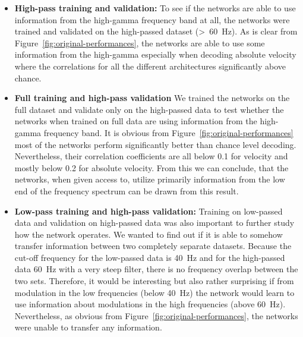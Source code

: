\begin{itemize}
    \item \textbf{High-pass training and validation:} To see if the networks are able to use information from the high-gamma frequency band at all, the networks were trained and validated on the high-passed dataset (>~60~Hz).
    As is clear from Figure~\ref{fig:original-performances}, the networks are able to use some information from the high-gamma especially when decoding absolute velocity where the correlations for all the different architectures significantly above chance.
    \item \textbf{Full training and high-pass validation} We trained the networks on the full dataset and validate only on the high-passed data to test whether the networks when trained on full data are using information from the high-gamma frequency band.
    It is obvious from Figure~\ref{fig:original-performances} most of the networks perform significantly better than chance level decoding.
    Nevertheless, their correlation coefficients are all below 0.1 for velocity and mostly below 0.2 for absolute velocity.
    From this we can conclude, that the networks, when given access to, utilize primarily information from the low end of the frequency spectrum can be drawn from this result.
    \item \textbf{Low-pass training and high-pass validation:}
    Training on low-passed data and validation on high-passed data was also important to further study how the network operates.
    We wanted to find out if it is able to somehow transfer information between two completely separate datasets.
    Because the cut-off frequency for the low-passed data is 40~Hz and for the high-passed data 60~Hz with a very steep filter, there is no frequency overlap between the two sets.
    Therefore, it would be interesting but also rather surprising if from modulation in the low frequencies (below 40~Hz) the network would learn to use information about modulations in the high frequencies (above 60~Hz).
    Nevertheless, as obvious from Figure~\ref{fig:original-performances}, the networks were unable to transfer any information.
    

\end{itemize}
